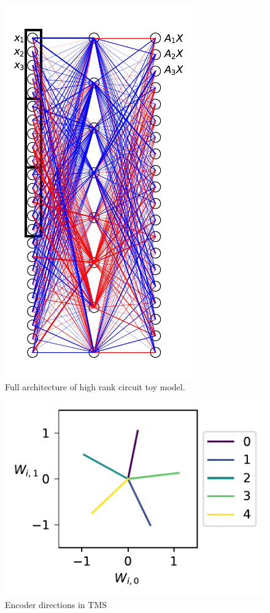 \documentclass{article}
\theoremstyle{plain}
\theoremstyle{definition}
\theoremstyle{remark}
\begin{document}
\begin{figure}[ht]
    \centerline{\includegraphics{../figures/s1_high_rank_circuit_setup.pdf}}
    \centering
    \caption{Full architecture of high rank circuit toy model.}\label{fig:s1_high_rank_circuit_setup}
\end{figure}



\begin{figure}[ht]
    \centerline{\includegraphics{../figures/s2_tms_encoder_directions.pdf}}
    \centering
    \caption{Encoder directions in TMS}\label{fig:s2_tms_encoder_directions}
\end{figure}
\end{document}
